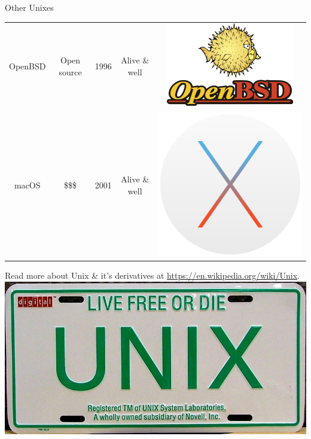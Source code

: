 \documentclass[graphics]{beamer}
\begin{document}
\begin{frame}{Other Unixes}
\begin{tabular}{c c c c c}
        OpenBSD & Open source & 1996 & Alive \& well & \includegraphics[scale=0.11]{L03_OperatingSystems/L3_openbsd.png} \\
        macOS & \$\$\$ & 2001 & Alive \& well & \includegraphics[scale=0.11]{L03_OperatingSystems/L3_osx.jpg}
    \end{tabular}
    \vfill
    \footnotesize{Read more about Unix \& it's derivatives at \url{https://en.wikipedia.org/wiki/Unix}.} \\
    \hfill \includegraphics[scale=0.08]{L03_OperatingSystems/L3_unix_plate.jpg}
\end{frame}
\end{document}
